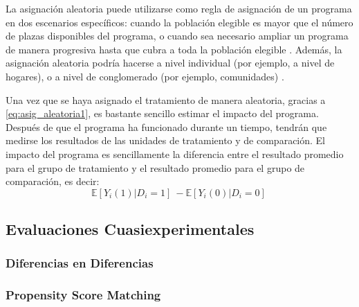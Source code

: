 \documentclass[../../main.tex]{subfiles}
\begin{document}
La asignación aleatoria puede utilizarse como regla de asignación de un programa en dos escenarios específicos: cuando la población elegible es mayor que el número de plazas disponibles del programa, o  cuando sea necesario ampliar un programa de manera progresiva hasta que cubra a toda la población elegible \cite{gertler-2016}. Además, la asignación aleatoria podría hacerse a nivel individual (por ejemplo, a nivel de hogares), o a nivel de conglomerado (por ejemplo, comunidades) \cite{bernal}.

Una vez que se haya asignado el tratamiento de manera aleatoria, gracias a \ref{eq:asig_aleatoria1}, es bastante sencillo estimar el impacto del programa. Después de que el programa ha funcionado durante un tiempo, tendrán que medirse los resultados de las unidades de tratamiento y de comparación. El impacto del programa es sencillamente la diferencia entre el resultado promedio para el grupo de tratamiento y el resultado promedio para el grupo de comparación, es decir:
\[
\mathbb{E} \left[Y_i(1)|D_i=1\right]\ - \mathbb{E} \left[Y_i(0)|D_i=0\right]\
\]


\subsection{Evaluaciones Cuasiexperimentales}

\subsubsection{Diferencias en Diferencias}

\subsubsection{Propensity Score Matching}

\end{document}
